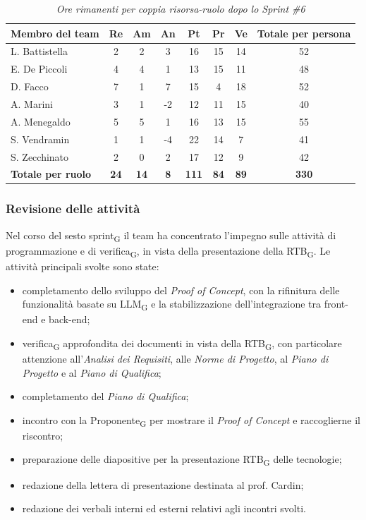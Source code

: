 \documentclass[a4paper, 10pt, colorlinks=true, linkcolor=black, urlcolor=blue, citecolor=blue, hidelinks]{article}
\renewcommand{\arraystretch}{1.2}
\begin{document}
\begin{table}[H]
    \centering
    \renewcommand{\arraystretch}{1.4}
    \begin{tabular}{|l|c|c|c|c|c|c|c|}
        \hline
        \rowcolor{bluBitless!15}
        \textbf{Membro del team} & \textbf{Re} & \textbf{Am} & \textbf{An} & \textbf{Pt} & \textbf{Pr} & \textbf{Ve} & \textbf{Totale per persona} \\
        \hline
        L. Battistella & 2 & 2 & 3 & 16 & 15 & 14 & 52 \\ \hline
        E. De Piccoli & 4 & 4 & 1 & 13 & 15 & 11 & 48 \\ \hline
        D. Facco & 7 & 1 & 7 & 15 & 4 & 18 & 52 \\ \hline
        A. Marini & 3 & 1 & -2 & 12 & 11 & 15 & 40 \\ \hline
        A. Menegaldo & 5 & 5 & 1 & 16 & 13 & 15 & 55 \\ \hline
        S. Vendramin & 1 & 1 & -4 & 22 & 14 & 7 & 41 \\ \hline
        S. Zecchinato & 2 & 0 & 2 & 17 & 12 & 9 & 42 \\ \hline
        \rowcolor{bluBitless!8}
        \textbf{Totale per ruolo} & \textbf{24} & \textbf{14} & \textbf{8} & \textbf{111} & \textbf{84} & \textbf{89} & \textbf{330} \\
        \hline
    \end{tabular}
    \caption{\textit{Ore rimanenti per coppia risorsa-ruolo dopo lo Sprint \#6}}
\end{table}

\subsubsection{Revisione delle attività}
Nel corso del sesto sprint\textsubscript{G} il team ha concentrato l'impegno sulle attività di programmazione e di verifica\textsubscript{G}, in vista della presentazione della RTB\textsubscript{G}. Le attività principali svolte sono state:
\begin{itemize}
    \item completamento dello sviluppo del \textit{Proof of Concept}, con la rifinitura delle funzionalità basate su LLM\textsubscript{G} e la stabilizzazione dell'integrazione tra front-end e back-end;
    \item verifica\textsubscript{G} approfondita dei documenti in vista della RTB\textsubscript{G}, con particolare attenzione all'\textit{Analisi dei Requisiti}, alle \textit{Norme di Progetto}, al \textit{Piano di Progetto} e al \textit{Piano di Qualifica};
    \item completamento del \textit{Piano di Qualifica};
    \item incontro con la Proponente\textsubscript{G} per mostrare il \textit{Proof of Concept} e raccoglierne il riscontro;
    \item preparazione delle diapositive per la presentazione RTB\textsubscript{G} delle tecnologie;
    \item redazione della lettera di presentazione destinata al prof. Cardin;
    \item redazione dei verbali interni ed esterni relativi agli incontri svolti.
\end{itemize}
\end{document}
